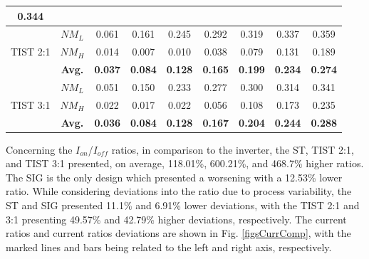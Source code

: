 \documentclass[pgmicro,mestrado,english]{iiufrgs}
\begin{document}
\begin{table}[]
{\begin{tabular}{|c|c|c|c|c|c|c|c|c|}
  \textbf{0.344} \\ \hline
\multirow{3}{*}{TIST 2:1} &
  $NM_{L}$ &
  0.061 &
  0.161 &
  0.245 &
  0.292 &
  0.319 &
  0.337 &
  0.359 \\ \cline{2-9} 
 &
  $NM_{H}$ &
  0.014 &
  0.007 &
  0.010 &
  0.038 &
  0.079 &
  0.131 &
  0.189 \\ \cline{2-9} 
 &
  \textbf{Avg.} &
  \textbf{0.037} &
  \textbf{0.084} &
  \textbf{0.128} &
  \textbf{0.165} &
  \textbf{0.199} &
  \textbf{0.234} &
  \textbf{0.274} \\ \hline
\multirow{3}{*}{TIST 3:1} &
  $NM_{L}$ &
  0.051 &
  0.150 &
  0.233 &
  0.277 &
  0.300 &
  0.314 &
  0.341 \\ \cline{2-9} 
 &
  $NM_{H}$ &
  0.022 &
  0.017 &
  0.022 &
  0.056 &
  0.108 &
  0.173 &
  0.235 \\ \cline{2-9} 
 &
  \textbf{Avg.} &
  \textbf{0.036} &
  \textbf{0.084} &
  \textbf{0.128} &
  \textbf{0.167} &
  \textbf{0.204} &
  \textbf{0.244} &
  \textbf{0.288} \\ \hline
\end{tabular}%
}
\end{table}

     Concerning the $I_{on}$/$I_{off}$ ratios, in comparison to the inverter, the ST, TIST 2:1, and TIST 3:1 presented, on average, 118.01\%, 600.21\%, and 468.7\% higher ratios. The SIG is the only design which presented a worsening with a 12.53\% lower ratio. While considering deviations into the ratio due to process variability, the ST and SIG presented 11.1\% and 6.91\% lower deviations, with the TIST 2:1 and 3:1 presenting 49.57\% and 42.79\% higher deviations, respectively. The current ratios and current ratios deviations are shown in Fig. \ref{figsCurrComp}, with the marked lines and bars being related to the left and right axis, respectively.
\end{document}
